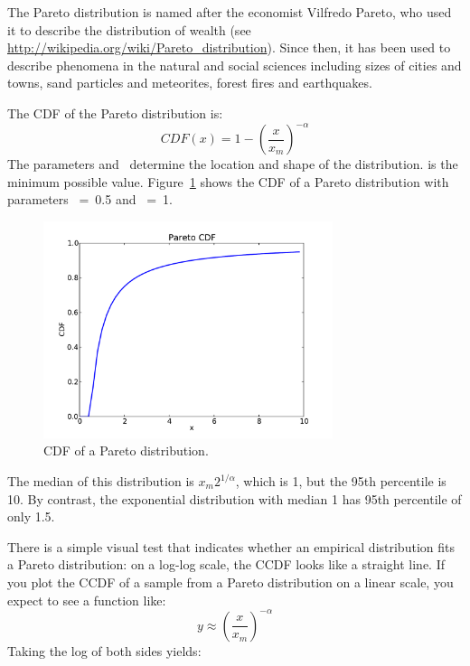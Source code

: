 \documentclass[12pt]{book}
\begin{document}
The Pareto distribution is named after the economist Vilfredo Pareto,
who used it to describe the distribution of wealth (see
\url{http://wikipedia.org/wiki/Pareto_distribution}).  Since then, it has
been used to describe phenomena in the natural and social
sciences including sizes of cities and towns, sand particles and
meteorites, forest fires and earthquakes.

The CDF of the Pareto distribution is:
%
\[ CDF(x) = 1 - \left( \frac{x}{x_m} \right) ^{-\alpha} \]
%
The parameters \x {} and \myalpha~determine the location and shape of
the distribution. \x {} is the minimum possible value.
Figure~\ref{pareto_cdf} shows the CDF of a Pareto distribution with
parameters \x {}~=~0.5 and \myalpha~=~1.

\begin{figure}
\centerline{\includegraphics[height=2.5in]{figs/pareto_cdf.pdf}}
\caption{CDF of a Pareto distribution.}
\label{pareto_cdf}
\end{figure}

The median of this distribution is $x_m 2^{1/\alpha}$, which is 1, but
the 95th percentile is 10.  By contrast, the exponential distribution
with median 1 has 95th percentile of only 1.5.    

There is a simple visual test that indicates whether an empirical
distribution fits a Pareto distribution: on a log-log scale, the CCDF
looks like a straight line.
If you plot the CCDF of a sample from a Pareto distribution on a
linear scale, you expect to see a function like:
%
\[ y \approx \left( \frac{x}{x_m} \right) ^{-\alpha} \]
%
Taking the log of both sides yields:

\end{document}
